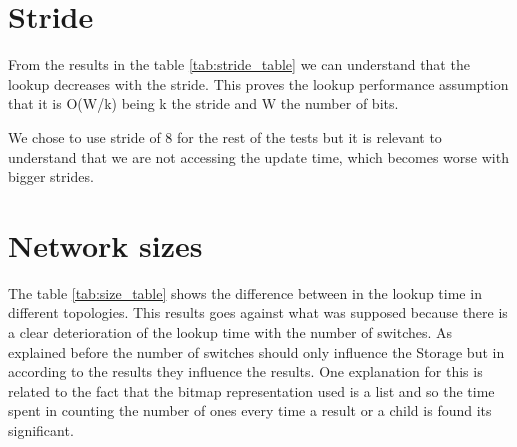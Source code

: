 \documentclass[]{report}
\begin{document}
\section{Stride}
From the results in the table \ref{tab:stride_table} we can understand that the lookup decreases with the stride. This proves the lookup performance assumption that it is O(W/k) being k the stride and W the number of bits.

We chose to use stride of 8 for the rest of the tests but it is relevant to understand that we are not accessing the update time, which becomes worse with bigger strides.



\begin{minipage}{\linewidth}%
\label{tab:stride_table}
\end{minipage}

\section{Network sizes}
	The table \ref{tab:size_table} shows the difference between in the lookup time in different topologies. This results goes against what was supposed because there is a clear deterioration of the lookup time with the number of switches. 
As explained before the number of switches should only influence the Storage but in according to the results they influence the results. One explanation for this is related to the fact that the bitmap representation used is a list and so the time spent in counting the number of ones every time a result or a child is found its significant.





\begin{minipage}{\linewidth}%
\label{tab:size_table}
\end{minipage}
\end{document}
